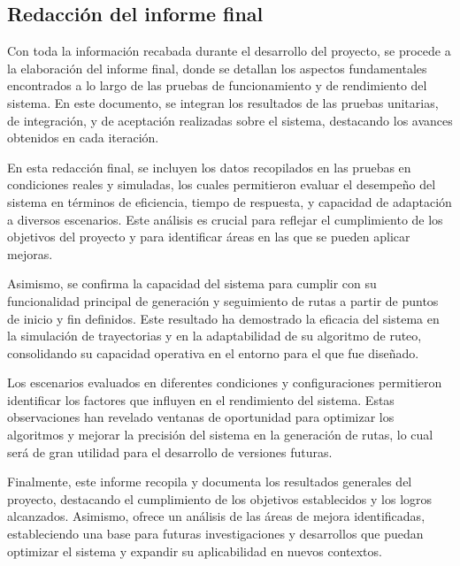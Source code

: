 \subsection{Redacci\'on del informe final} %

    Con toda la informaci\'on recabada durante el desarrollo del proyecto, 
        se procede a la elaboraci\'on del informe final, donde se detallan 
        los aspectos fundamentales encontrados a lo largo de las pruebas 
        de funcionamiento y de rendimiento del sistema. En este documento, 
        se integran los resultados de las pruebas unitarias, de integraci\'on, 
        y de aceptaci\'on realizadas sobre el sistema, destacando los avances 
        obtenidos en cada iteraci\'on.

    \vskip 0.5cm

    En esta redacci\'on final, se incluyen los datos recopilados en las pruebas en condiciones 
        reales y simuladas, los cuales permitieron evaluar el desempe\~no del sistema en t\'erminos 
        de eficiencia, tiempo de respuesta, y capacidad de adaptaci\'on a diversos escenarios. 
        Este an\'alisis es crucial para reflejar el cumplimiento de los objetivos del proyecto y 
        para identificar \'areas en las que se pueden aplicar mejoras.

    \vskip 0.5cm

    Asimismo, se confirma la capacidad del sistema para cumplir con su funcionalidad principal 
        de generaci\'on y seguimiento de rutas a partir de puntos de inicio y fin definidos. 
        Este resultado ha demostrado la eficacia del sistema en la simulaci\'on de trayectorias 
        y en la adaptabilidad de su algoritmo de ruteo, consolidando su capacidad operativa en 
        el entorno para el que fue dise\~nado.

    \vskip 0.5cm

    Los escenarios evaluados en diferentes condiciones y configuraciones permitieron identificar 
        los factores que influyen en el rendimiento del sistema. Estas observaciones han revelado 
        ventanas de oportunidad para optimizar los algoritmos y mejorar la precisi\'on del sistema 
        en la generaci\'on de rutas, lo cual ser\'a de gran utilidad para el desarrollo de versiones futuras.

    \vskip 0.5cm

    Finalmente, este informe recopila y documenta los resultados generales del proyecto, 
        destacando el cumplimiento de los objetivos establecidos y los logros alcanzados. 
        Asimismo, ofrece un an\'alisis de las \'areas de mejora identificadas, estableciendo 
        una base para futuras investigaciones y desarrollos que puedan optimizar el sistema y 
        expandir su aplicabilidad en nuevos contextos.
    \vskip 0.5cm